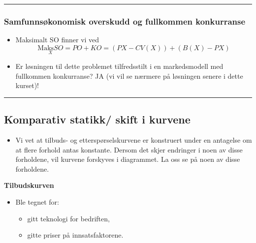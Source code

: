 \documentclass[
  letterpaper,
  DIV=11,
  numbers=noendperiod]{scrartcl}
\providecommand{\tightlist}{%
  \setlength{\itemsep}{0pt}\setlength{\parskip}{0pt}}\usepackage{longtable,booktabs,array}
\begin{document}
\begin{center}\rule{0.5\linewidth}{0.5pt}\end{center}

\subsubsection{Samfunnsøkonomisk overskudd og fullkommen
konkurranse}\label{samfunnsuxf8konomisk-overskudd-og-fullkommen-konkurranse}

\begin{itemize}
\item
  Maksimalt SO finner vi ved \begin{equation*}
  \underset{X}{\text{Maks}SO}=PO+KO=(PX-CV(X))+(B(X)-PX)
  \end{equation*}
\item
  Er løsningen til dette problemet tilfredsstilt i en markedsmodell med
  fullkommen konkurranse? JA (vi vil se nærmere på løsningen senere i
  dette kurset)!
\end{itemize}

\begin{center}\rule{0.5\linewidth}{0.5pt}\end{center}

\subsection{Komparativ statikk/ skift i
kurvene}\label{komparativ-statikk-skift-i-kurvene}

\begin{itemize}
\tightlist
\item
  Vi vet at tilbuds- og etterspørselskurvene er konstruert under en
  antagelse om at flere forhold antas konstante. Dersom det skjer
  endringer i noen av disse forholdene, vil kurvene forskyves i
  diagrammet. La oss se på noen av disse forholdene.
\end{itemize}

\textbf{Tilbudskurven}

\begin{itemize}
\tightlist
\item
  Ble tegnet for:

  \begin{itemize}
  \tightlist
  \item
    gitt teknologi for bedriften,
  \item
    gitte priser på innsatsfaktorene.
  \end{itemize}
\end{itemize}
\end{document}
